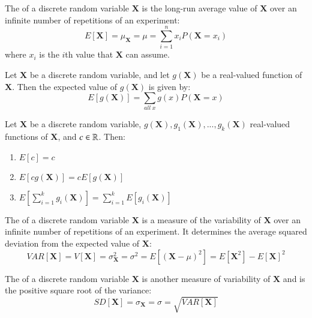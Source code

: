 \documentclass[12pt]{report}
\begin{document}
\begin{defn}{}{}
    The  of a discrete random variable $\mathbf{X}$ is the long-run average value of $\mathbf{X}$ over an infinite number of repetitions of an experiment: \begin{equation*}
        E[\mathbf{X}] = \mu_{\mathbf{X}} = \mu = \sum\limits_{i=1}^nx_iP(\mathbf{X}=x_i)
    \end{equation*}
    where $x_i$ is the $i$th value that $\mathbf{X}$ can assume.
\end{defn}

\begin{prop}{}{}
    Let $\mathbf{X}$ be a discrete random variable, and let $g(\mathbf{X})$ be a real-valued function of $\mathbf{X}$. Then the expected value of $g(\mathbf{X})$ is given by:
    \begin{equation*}
        E[g(\mathbf{X})] = \sum\limits_{all\;x}g(x)P(\mathbf{X} = x)
    \end{equation*}
\end{prop}

\begin{prop}{}{}
    Let $\mathbf{X}$ be a discrete random variable, $g(\mathbf{X}), g_1(\mathbf{X}),...,g_k(\mathbf{X})$ real-valued functions of $\mathbf{X}$, and $c \in \mathbb R$. Then: \begin{enumerate}
        \item $E[c] = c$
        \item $E[cg(\mathbf{X})] = cE[g(\mathbf{X})]$
        \item $E\left[\sum\limits_{i=1}^kg_i(\mathbf{X})\right] = \sum\limits_{i=1}^kE[g_i(\mathbf{X})]$
    \end{enumerate}
\end{prop}

\begin{defn}{}{}
    The  of a discrete random variable $\mathbf{X}$ is a measure of the variability of $\mathbf{X}$ over an infinite number of repetitions of an experiment. It determines the average squared deviation from the expected value of $\mathbf{X}$: \begin{equation*}
        VAR[\mathbf{X}] = V[\mathbf{X}] = \sigma_{\mathbf{X}}^2 = \sigma^2 = E[(\mathbf{X}-\mu)^2] = E[\mathbf{X}^2] - E[\mathbf{X}]^2
    \end{equation*}
\end{defn}

\begin{defn}{}{}
    The  of a discrete random variable $\mathbf{X}$ is another measure of variability of $\mathbf{X}$ and is the positive square root of the variance: \begin{equation*}
        SD[\mathbf{X}] = \sigma_{\mathbf{X}} = \sigma = \sqrt{VAR[\mathbf{X}]}
    \end{equation*}
\end{defn}
\end{document}
